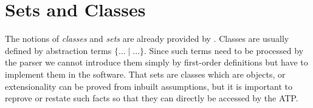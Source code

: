 \documentclass[11pt]{article}
\begin{document}
\begin{forthel}
\end{forthel}


\section{Sets and Classes}

The notions of \textit{classes} and \textit{sets} are already
provided by \Naproche. Classes are usually defined by
abstraction terms $\{\dots\mid\dots\}$. Since such terms need to be
processed by the parser we cannot introduce them simply by first-order
definitions but have to implement them in the software.
That sets are classes which are objects, or extensionality can be proved
from inbuilt assumptions, but it is important to reprove or restate such
facts so that they can directly be accessed by the ATP.
\end{document}
